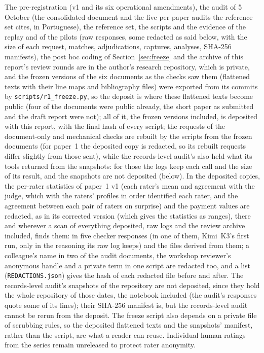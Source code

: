 \documentclass[11pt]{article}
\begin{document}
The pre-registration (v1 and its six operational amendments), the audit of 5 October (the consolidated document and the five
per-paper audits the reference set cites, in Portuguese), the reference set, the scripts and the evidence of the replay and
of the pilots (raw responses, some redacted as said below, with the size of each request, matches, adjudications, captures, analyses, SHA-256 manifests), the post hoc coding of
Section~\ref{sec:freeze} and the archive of this report's review rounds are in the author's research repository, which is private, and the frozen
versions of the six documents as the checks saw them (flattened texts with their line maps and bibliography files) were exported from its commits by \texttt{scripts/r1\_freeze.py}, so the
deposit is where these flattened texts become public (four of the documents were public already, the short paper as submitted and the
draft report were not); all of it, the frozen versions included, is deposited with this report, with the final hash of every script; the requests
of the document-only and mechanical checks are rebuilt by the scripts from the frozen documents (for paper~1 the deposited copy is
redacted, so its rebuilt requests differ slightly from those sent), while the records-level audit's
also held what its tools returned from the snapshots: for those the logs keep each call and the size of its result, and the
snapshots are not deposited (below). In the deposited copies, the per-rater statistics of paper~1 v1 (each rater's mean and
agreement with the judge, which with the raters' profiles in order identified each rater, and the agreement between each pair of
raters on surprise) and the payment values are redacted, as in its corrected version (which gives the statistics as ranges), there
and wherever a scan of everything deposited, raw logs and the review archive included, finds them: in five checker responses (in
one of them, Kimi~K3's first run, only in the reasoning its raw log keeps) and the files derived from them; a colleague's name in two of the audit documents, the workshop reviewer's anonymous handle and a private term in one script
are redacted too, and a list (\texttt{REDACTIONS.json}) gives the hash of
each redacted file before and after. The records-level audit's snapshots of the repository are not deposited, since
they hold the whole repository of those dates, the notebook included (the audit's responses quote some of its lines); their SHA-256
manifest is, but the records-level audit cannot be rerun from the deposit.
The freeze script also depends on a private file of scrubbing rules, so the deposited flattened texts and the snapshots' manifest,
rather than the script, are what a reader can reuse. Individual human ratings from the series remain unreleased to protect
rater anonymity.
\end{document}
